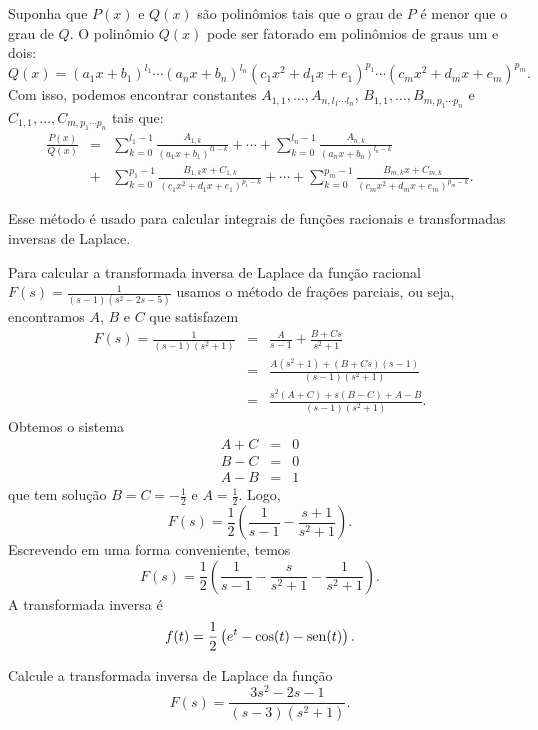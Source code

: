 Suponha que $P(x)$ e $Q(x)$ são polinômios tais que o grau de $P$ é menor que o grau de $Q$. O polinômio $Q(x)$ pode ser fatorado em polinômios de graus um e dois:
$$
Q(x) = (a_1x + b_1)^{l_1}\cdots (a_nx + b_n)^{l_n}(c_1x^2 + d_1x + e_1)^{p_1}\cdots (c_m x^2 + d_m x + e_m)^{p_m}.
$$
Com isso, podemos encontrar constantes $A_{1,1}, \ldots, A_{n,l_1\cdots l_n}$, $B_{1,1}, \ldots, B_{m,p_1\cdots p_n}$ e $C_{1,1}, \ldots, C_{m,p_1\cdots p_n}$ tais que:
\begin{eqnarray*}
\frac{P(x)}{Q(x)} &=& \sum_{k=0}^{l_1-1} \frac{A_{1,k}}{(a_1x + b_1)^{l1-k}} + \cdots + \sum_{k=0}^{l_n-1}\frac{A_{n,k}}{(a_nx + b_n)^{l_n-k}} \\&+& \sum_{k=0}^{p_1-1} \frac{B_{1,k}x + C_{1,k}}{(c_1 x^2 + d_1 x + e_1)^{p_1-k}} + \cdots + \sum_{k=0}^{p_m-1} \frac{B_{m,k}x + C_{m,k}}{(c_mx^2 + d_mx + e_m)^{p_m-k}}.
\end{eqnarray*}

Esse método é usado para calcular integrais de funções racionais e transformadas inversas de Laplace.

\begin{ex}Para calcular a transformada inversa de Laplace da função racional $F(s)=\frac{1}{(s-1)(s^2-2s-5)}$ usamos o método de frações parciais, ou seja, encontramos $A$, $B$ e $C$ que satisfazem
\begin{eqnarray*}
 F(s)=\frac{1}{(s-1)(s^2+1)}&=&\frac{A}{s-1}+\frac{B+Cs}{s^2+1}\\&=&\frac{A(s^2+1)+(B+Cs)(s-1)}{(s-1)(s^2+1)}\\
 &=&\frac{s^2(A+C)+s(B-C)+A-B}{(s-1)(s^2+1)}.
\end{eqnarray*}
Obtemos o sistema
\begin{eqnarray*}
A+C&=&0\\
B-C&=&0\\
A-B&=&1
\end{eqnarray*}
que tem solução $B=C=-\frac{1}{2}$ e $A=\frac{1}{2}$. Logo,
$$
F(s)=\frac{1}{2}\left(\frac{1}{s-1}-\frac{s+1}{s^2+1}\right).
$$
Escrevendo em uma forma conveniente, temos
$$
F(s)=\frac{1}{2}\left(\frac{1}{s-1}-\frac{s}{s^2+1}-\frac{1}{s^2+1}\right).
$$
A transformada inversa é
$$
f(t)=\frac{1}{2}\left(e^{t}-\cos(t)-\operatorname{sen}(t)\right).
$$
\end{ex}
\begin{prob}Calcule a transformada inversa de Laplace da função 
$$
F(s)=\frac{3s^2-2s-1}{(s-3)(s^2+1)}.
$$
 
 
\end{prob}


